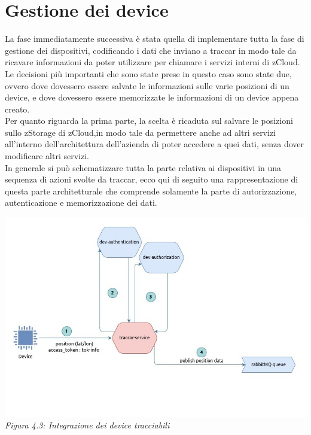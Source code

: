 \documentclass[a4paper,titlepage,12pt]{book}
\begin{document}
\section{\sffamily
Gestione dei device}
La fase immediatamente successiva è stata quella di implementare tutta la fase di gestione dei dispositivi, codificando i dati che inviano a traccar in modo tale da ricavare informazioni da poter utilizzare per chiamare i servizi interni di zCloud. Le decisioni più importanti che sono state prese in questo caso sono state due, ovvero dove dovessero essere salvate le informazioni sulle varie posizioni di un device, e dove dovessero essere memorizzate le informazioni di un device appena creato. \\
Per quanto riguarda la prima parte, la scelta è ricaduta sul salvare le posizioni sullo zStorage di zCloud,in modo tale da permettere anche ad altri servizi all'interno dell'architettura dell'azienda di poter accedere a quei dati, senza dover modificare altri servizi.\\
In generale si può schematizzare tutta la parte relativa ai dispositivi in una sequenza di azioni svolte da traccar, ecco qui di seguito una rappresentazione di questa parte architetturale che comprende solamente la parte di autorizzazione, autenticazione e memorizzazione dei dati.

\begin{center}
\centering
\includegraphics[scale=0.6]{images/dev-aut-traccar.jpg}\\ 
\textit{Figura 4.3: Integrazione dei device tracciabili}

\end{center}
\end{document}

